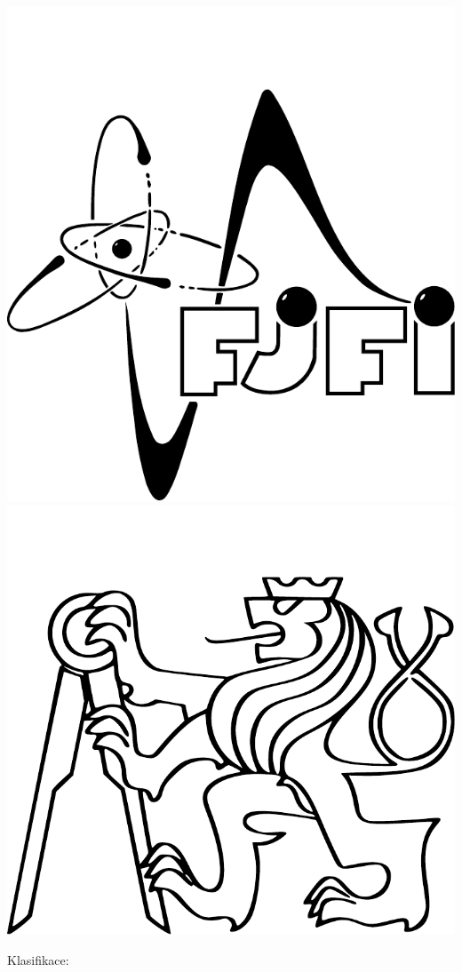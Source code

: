 \documentclass[10pt]{scrartcl}
\begin{document}
\begin{multicols}{2}
\begin{flushright}
\includegraphics[scale=0.2]{img/fjfi.pdf}
\hspace{0.4cm}
\includegraphics[scale=0.2]{img/cvut.pdf}

\begin{flushleft}
\end{flushleft} 
\textsf{Klasifikace:} \hspace{3.2cm} 

\end{flushright}
\end{multicols}
\end{document}
